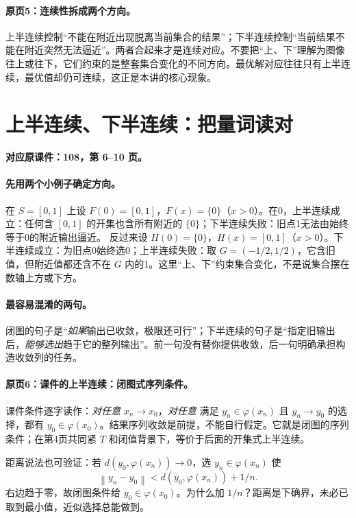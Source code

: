 \documentclass[11pt,a4paper]{article}
\newcommand{\norm}[1]{\left\lVert#1\right\rVert}
\theoremstyle{definition}\newtheorem{definition}{定义}\newtheorem{example}{例}
\begin{document}
\paragraph{原页5：连续性拆成两个方向。}上半连续控制“不能在附近出现脱离当前集合的结果”；下半连续控制“当前结果不能在附近突然无法逼近”。两者合起来才是连续对应。不要把“上、下”理解为图像往上或往下，它们约束的是整套集合变化的不同方向。最优解对应往往只有上半连续，最优值却仍可连续，这正是本讲的核心现象。



\clearpage\section{上半连续、下半连续：把量词读对}\label{g:108:6}

\textbf{对应原课件：108，第 6--10 页。}


\paragraph{先用两个小例子确定方向。}
在 $S=[0,1]$ 上设 $F(0)=[0,1]$，$F(x)=\{0\}$（$x>0$）。在0，上半连续成立：任何含 $[0,1]$ 的开集也含所有附近的 $\{0\}$；下半连续失败：旧点1无法由始终等于0的附近输出逼近。
反过来设 $H(0)=\{0\}$，$H(x)=[0,1]$（$x>0$）。下半连续成立：为旧点0始终选0；上半连续失败：取 $G=(-1/2,1/2)$，它含旧值，但附近值都还含不在 $G$ 内的1。这里“上、下”约束集合变化，不是说集合摆在数轴上方或下方。
\paragraph{最容易混淆的两句。}
闭图的句子是“\emph{如果}输出已收敛，极限还可行”；下半连续的句子是“指定旧输出后，\emph{能够选出}趋于它的整列输出”。前一句没有替你提供收敛，后一句明确承担构造收敛列的任务。


\paragraph{原页6：课件的上半连续：闭图式序列条件。}课件条件逐字读作：\emph{对任意} $x_n\to x_0$，\emph{对任意} 满足 $y_n\in\varphi(x_n)$ 且 $y_n\to y_0$ 的选择，都有 $y_0\in\varphi(x_0)$。结果序列收敛是前提，不能自行假定。它就是闭图的序列条件；在第4页共同紧 $T$ 和闭值背景下，等价于后面的开集式上半连续。

距离说法也可验证：若 $d(y_0,\varphi(x_n))\to0$，选 $y_n\in\varphi(x_n)$ 使
\[\norm{y_n-y_0}<d(y_0,\varphi(x_n))+1/n.\]
右边趋于零，故闭图条件给 $y_0\in\varphi(x_0)$。为什么加 $1/n$？距离是下确界，未必已取到最小值，近似选择总能做到。
\end{document}
